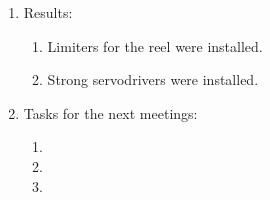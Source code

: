 \begin{enumerate}
\begin{enumerate}
	\end{enumerate}
	
	\item Results:
	\begin{enumerate}
		
		\item Limiters for the reel were installed.
		
		\item Strong servodrivers were installed.
		
	\end{enumerate}
	
	\item Tasks for the next meetings:
	\begin{enumerate}
		
		\item 
		
		\item 
		
        \item 
			
	\end{enumerate}
\end{enumerate}
\fillpage
